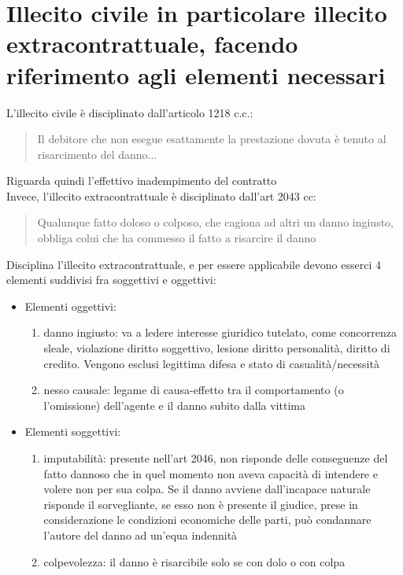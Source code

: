 \documentclass[8pt,oneside,a4paper]{article}
\begin{document}
	\section{Illecito civile in particolare illecito extracontrattuale, facendo riferimento agli elementi necessari}
	L'illecito civile è disciplinato dall'articolo 1218 c.c.:
	\begin{quote}
		Il debitore che non esegue esattamente la prestazione dovuta è tenuto al risarcimento del danno...
	\end{quote}
	Riguarda quindi l'effettivo inadempimento del contratto\\
	Invece, l'illecito extracontrattuale è disciplinato dall'art 2043 cc:
	\begin{quote}
		Qualunque fatto doloso o colposo, che cagiona ad altri un danno ingiusto, obbliga colui che ha commesso il fatto a risarcire il danno
	\end{quote}
	Disciplina l'illecito extracontrattuale, e per essere applicabile devono esserci 4 elementi suddivisi fra soggettivi e oggettivi:
	\begin{itemize}
		\item Elementi oggettivi:
		\begin{enumerate}
			\item danno ingiusto: va a ledere interesse giuridico tutelato, come concorrenza sleale, violazione diritto soggettivo, lesione diritto personalità, diritto di credito. Vengono esclusi legittima difesa e stato di casualità/necessità
			\item nesso causale: legame di causa-effetto tra il comportamento (o l’omissione) dell’agente e il danno subito dalla vittima
		\end{enumerate}
		\item Elementi soggettivi:
		\begin{enumerate}
			\item imputabilità: presente nell'art 2046, non risponde delle conseguenze del fatto dannoso che in quel momento non aveva capacità di intendere e volere non per sua colpa. Se il danno avviene dall'incapace naturale risponde il sorvegliante, se esso non è presente il giudice, prese in considerazione le condizioni economiche delle parti, può condannare l'autore del danno ad un'equa indennità
			\item colpevolezza: il danno è risarcibile solo se con dolo o con colpa
		\end{enumerate}
	\end{itemize}
\end{document}
